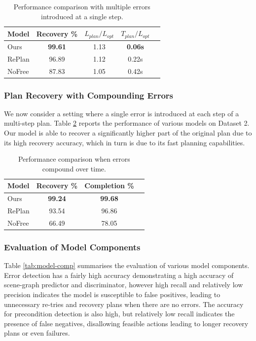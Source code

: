 \begin{table}
    \centering
    \caption{Performance comparison with multiple errors introduced at a single step.}
    \begin{tabular}{|l|c|c|c|c|}
    \hline
         Model & Recovery \% &  $L_{plan}/L_{opt}$ & $T_{plan}/L_{opt}$  \\ 
         \hline
         \hline
         Ours & \textbf{99.61} & 1.13 & \textbf{0.06s} \\ 
         \hline 
         RePlan & 96.89 & 1.12 & 0.22s \\
        \hline 
         NoFree & 87.83 & 1.05 & 0.42s \\ 
         \hline
    \end{tabular}
    \label{tab:dset1}
\end{table}

%
\subsubsection{Plan Recovery with Compounding Errors}
%
We now consider a setting where a single error is introduced at each step of a multi-step plan. Table \ref{tab:dset2} reports the performance of various models on Dataset 2. Our model is able to recover a significantly higher part of the original plan due to its high recovery accuracy, which in turn is due to its fast planning capabilities.
%

\begin{table}
    \centering
    \caption{Performance comparison when errors compound over time. }
    \begin{tabular}{|l|c|c|c|}
    \hline
         Model & Recovery \% & Completion \% \\ 
         \hline
         \hline
         Ours & \textbf{99.24} & \textbf{99.68} \\ 
         \hline 
         RePlan & 93.54 & 96.86 \\
        \hline 
         NoFree & 66.49 & 78.05 \\ 
         \hline
    \end{tabular}
    \label{tab:dset2}
\end{table}

%
\subsubsection{Evaluation of Model Components}
%
Table \ref{tab:model-comp} summarises the evaluation of various model components. Error detection has a fairly high accuracy demonstrating a high accuracy of scene-graph predictor and discriminator, however high recall and relatively low precision indicates the model is susceptible to false positives, leading to unnecessary re-tries and recovery plans when there are no errors. The accuracy for precondition detection is also high, but relatively low recall indicates the presence of false negatives, disallowing feasible actions leading to longer recovery plans or even failures.

